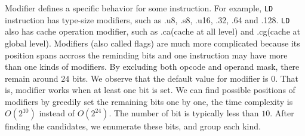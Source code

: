Modifier defines a specific behavior for some instruction. For example,
{\tt LD} instruction has type-size modifiers, such as .u8, .s8, .u16, .32, .64 and .128. {\tt LD} also has cache operation modifier, such as .ca(cache at all level) and .cg(cache at global level). Modifiers (also called flags) are much more complicated because its position spans accross the reminding bits and one instruction may have more than one kinds of modifiers. By excluding both opcode and operand mask, there remain around $24$ bits. We observe that the default value for modifier is $0$. That is, modifier works when at least one bit is set. We can find possible positions of modifiers 
by greedily set the remaining bits one by one, the time complexity is $O(2^{10})$ instead of $O(2^{24})$. The number of bit is typically less
than $10$. After finding the candidates, we enumerate these bits, and group each kind.



